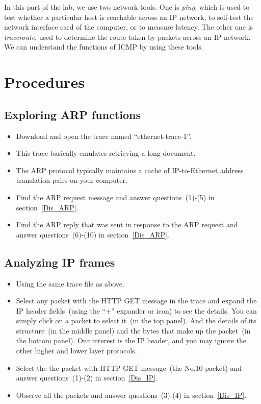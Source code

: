 \noindent In this part of the lab, we use two network tools. One is \textit{ping}, which is used to test whether a particular host is reachable across an IP network, to self-test the network interface card of the computer, or to measure latency. The other one is \textit{traceroute}, used to determine the route taken by packets across an IP network.  We can understand the functions of ICMP by using these tools.

\section{Procedures}
\subsection{Exploring ARP functions}\label{Pro_ARQ}
\begin{itemize}
\item Download and open the trace named ``ethernet-trace-1''.

\item This trace basically emulates retrieving a long document.

\item The ARP protocol typically maintains a cache of IP-to-Ethernet address translation pairs on your computer.

\item Find the ARP request message and answer questions~(1)-(5) in section~\ref{Dis_ARP}.

\item Find the ARP reply that was sent in response to the ARP request and answer questions~(6)-(10) in section~\ref{Dis_ARP}.
\end{itemize}

\subsection{Analyzing IP frames}\label{Pro_IP}
\begin{itemize}
\item Using the same trace file as above.

\item Select any packet with the HTTP GET message in the trace and expand the IP header fields~(using the “+” expander or icon) to see the details. You can simply click on a packet to select it~(in the top panel). And the details of its structure~(in the middle panel) and the bytes that make up the packet~(in the bottom panel). Our interest is the IP header, and you may ignore the other higher and lower layer protocols. 

\item Select the the packet with HTTP GET message~(the No.10 packet) and answer questions~(1)-(2) in section~\ref{Dis_IP}.

\item Observe all the packets and answer questions~(3)-(4) in section~\ref{Dis_IP}.
\end{itemize}

